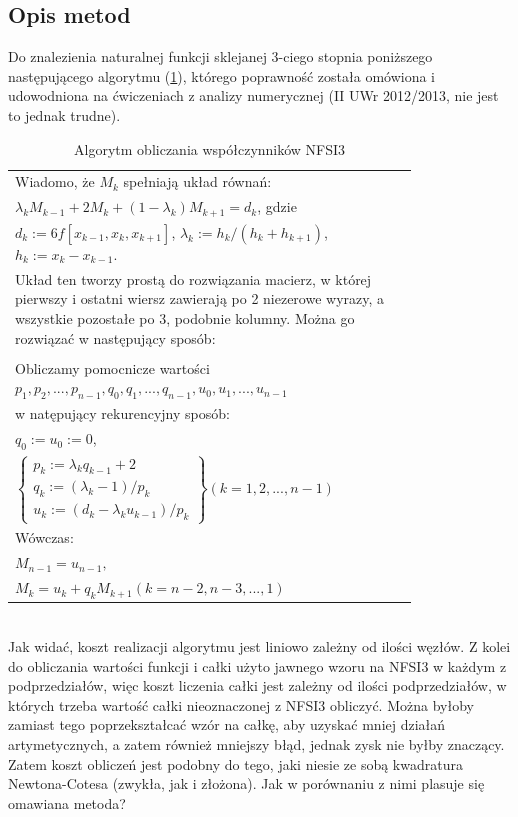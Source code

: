 \documentclass[11pt,wide]{mwart}
\begin{document}
\subsection{Opis metod}
Do znalezienia naturalnej funkcji sklejanej 3-ciego stopnia poniższego następującego algorytmu (\ref{algorytm}), którego poprawność została omówiona i udowodniona na ćwiczeniach z analizy numerycznej (II UWr 2012/2013, nie jest to jednak trudne).
\begin{table}[!h]
  \centering
  \begin{tabular}{|p{0.8\linewidth}|}
    \hline
    Wiadomo, że $M_k$ spełniają układ równań:\\
    $
    \lambda_kM_{k-1} + 2M_k + (1-\lambda_k)M_{k+1} = d_k
    $, gdzie\\
    $d_k:=6f[x_{k-1},x_k,x_{k+1}]$, $\lambda_k:=h_k/(h_k+h_{k+1})$,$h_k:=x_k- x_{k-1}$.\\
    Układ ten tworzy prostą do rozwiązania macierz, w której pierwszy i ostatni wiersz zawierają po 2 niezerowe wyrazy, a wszystkie pozostałe po 3, podobnie kolumny. Można go rozwiązać w następujący sposób:\\\\
    \hline
    Obliczamy pomocnicze wartości $p_1,p_2,...,p_{n-1}, q_0,q_1,...,q_{n-1}, u_0,u_1,...,u_{n-1}$\\ w natępujący rekurencyjny sposób:\\
    $q_0:=u_0:=0$,\\
    \begin{math}
      \left\{ 
      \begin{array}{l}
        p_k:=\lambda_kq_{k-1}+2 \\
        q_k:=(\lambda_k-1)/p_k \\
        u_k:=(d_k-\lambda_ku_{k-1})/p_k
      \end{array} 
    \right\} (k=1,2,...,n-1)
    \end{math}
    \\Wówczas:\\
    $M_{n-1}=u_{n-1},$\\$M_k=u_k+q_kM_{k+1} (k=n-2,n-3,...,1)$
    \\\hline
  \end{tabular}
  \caption{Algorytm obliczania współczynników NFSI3}
  \label{algorytm}
\end{table}
\\\indent
Jak widać, koszt realizacji algorytmu jest liniowo zależny od ilości węzłów. Z kolei do obliczania wartości funkcji i całki użyto jawnego wzoru na NFSI3 w każdym z podprzedziałów, więc koszt liczenia całki jest zależny od ilości podprzedziałów, w których trzeba wartość całki nieoznaczonej z NFSI3 obliczyć. Można byłoby zamiast tego poprzekształcać wzór na całkę, aby uzyskać mniej działań artymetycznych, a zatem również mniejszy błąd, jednak zysk nie byłby znaczący. 
Zatem koszt obliczeń jest podobny do tego, jaki niesie ze sobą kwadratura Newtona-Cotesa (zwykła, jak i złożona). Jak w porównaniu z nimi plasuje się omawiana metoda?
\end{document}
